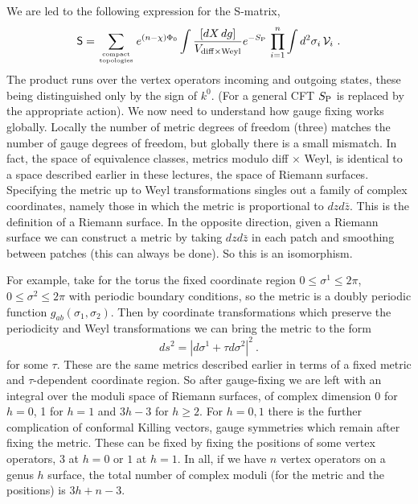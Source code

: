 We are led to the following expression for the S-matrix,
\begin{equation}
{\sf S} = \sum_{\rm compact \atop topologies}e^{(n - \chi)\Phi_0} 
\int \frac{[dX\,dg]}{V_{\rm diff \times Weyl}} e^{-S_{\rm P} }\,
\prod_{i=1}^n \int d^2 \sigma_i \,{\cal V}_i\ . \label{sma}
\end{equation}
The product runs over the vertex operators incoming and outgoing
states, these being distinguished only by the sign of $k^0$.
(For a general CFT $S_{\rm P}$ is replaced by the appropriate
action).  We now need to understand how gauge fixing works
globally.  Locally the number of metric degrees of freedom (three)
matches
the number of gauge degrees of freedom, but globally there is a
small mismatch.  In fact, the space of equivalence classes, metrics
modulo diff $\times$ Weyl, is identical to a space described
earlier in these lectures, the space of Riemann surfaces.
Specifying the metric up to Weyl transformations singles out a
family of complex coordinates, namely those in which the metric is
proportional to $dz d\bar z$.  This is the definition of a Riemann
surface.  In the opposite direction, given a Riemann surface we can
construct a metric by taking $dz d\bar z$ in each patch and smoothing
between patches (this can always be done).  So this is an
isomorphism.

For example, take for the torus the fixed coordinate region
$0 \leq \sigma^1 \leq 2\pi$, $0 \leq \sigma^2 \leq 2\pi$ with
periodic boundary conditions, so the metric is a doubly periodic
function $g_{ab}(\sigma_1,\sigma_2)$.  Then by coordinate
transformations which preserve the periodicity and Weyl
transformations we can bring the metric to the form
\begin{equation}
ds^2 = |d\sigma^1 + \tau d\sigma^2|^2\ .
\end{equation}
for some $\tau$.  These are the same metrics described earlier in
terms of a fixed metric and $\tau$-dependent coordinate region.
So after gauge-fixing we are left with an integral over the moduli
space of Riemann surfaces, of complex dimension $0$ for  $h=0$, 1
for $h=1$ and $3h-3$ for $h \geq 2$.  For $h=0,1$ there is the
further complication of conformal Killing vectors, gauge symmetries
which remain after fixing the metric.  These can be fixed by fixing
the positions of some vertex operators, 3 at $h=0$ or $1$ at $h=1$.
In all, if we have $n$ vertex operators on a genus $h$ surface, 
the total number of complex moduli (for the metric and the positions)
is $3h + n - 3$.

